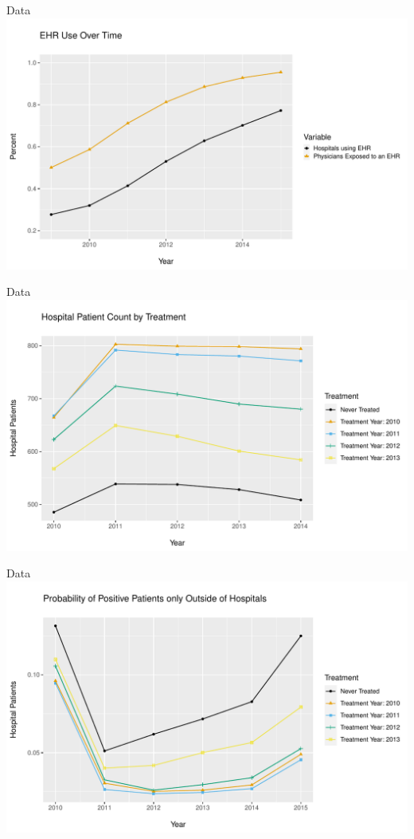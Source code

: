 \documentclass[10pt]{beamer}
\begin{document}
\begin{frame}{Data}
    \centering
    \includegraphics[scale=.5]{Objects/sum_stats_year.pdf}
\end{frame}

\begin{frame}{Data}
\centering
    \includegraphics[scale=.5]{Objects/cont_treatment_graph.pdf}
    
\end{frame}

\begin{frame}{Data}
    \centering
    \includegraphics[scale=.5]{Objects/ind_treatment_graph.pdf}
\end{frame}
\end{document}
